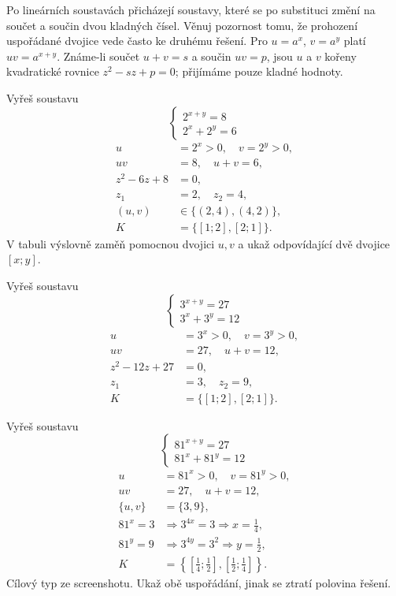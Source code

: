 \documentclass[11pt,a4paper]{article}
\begin{document}
Po lineárních soustavách přicházejí soustavy, které se po substituci změní na součet a součin dvou kladných čísel. Věnuj pozornost tomu, že prohození uspořádané dvojice vede často ke druhému řešení.
Pro $u=a^x$, $v=a^y$ platí $uv=a^{x+y}$. Známe-li součet $u+v=s$ a součin $uv=p$, jsou $u$ a $v$ kořeny kvadratické rovnice $z^2-sz+p=0$; přijímáme pouze kladné hodnoty.
\begin{prikladReseniBox}[title={Příklad 1}]
Vyřeš soustavu \[
\begin{cases}2^{x+y}=8\\2^x+2^y=6\end{cases}
\]
\tcblower
\[
\begin{aligned}u&=2^x>0,\quad v=2^y>0,\\uv&=8,\quad u+v=6,\\z^2-6z+8&=0,\\z_1&=2,\quad z_2=4,\\(u,v)&\in\{(2,4),(4,2)\},\\K&=\{[1;2],[2;1]\}.\end{aligned}
\]
V tabuli výslovně zaměň pomocnou dvojici $u,v$ a ukaž odpovídající dvě dvojice $[x;y]$.
\end{prikladReseniBox}
\begin{prikladReseniBox}[title={Příklad 2}]
Vyřeš soustavu \[
\begin{cases}3^{x+y}=27\\3^x+3^y=12\end{cases}
\]
\tcblower
\[
\begin{aligned}u&=3^x>0,\quad v=3^y>0,\\uv&=27,\quad u+v=12,\\z^2-12z+27&=0,\\z_1&=3,\quad z_2=9,\\K&=\{[1;2],[2;1]\}.\end{aligned}
\]

\end{prikladReseniBox}
\begin{prikladReseniBox}[title={Příklad 3}]
Vyřeš soustavu \[
\begin{cases}81^{x+y}=27\\81^x+81^y=12\end{cases}
\]
\tcblower
\[
\begin{aligned}u&=81^x>0,\quad v=81^y>0,\\uv&=27,\quad u+v=12,\\\{u,v\}&=\{3,9\},\\81^x=3&\Rightarrow 3^{4x}=3\Rightarrow x=\frac{1}{4},\\81^y=9&\Rightarrow 3^{4y}=3^2\Rightarrow y=\frac{1}{2},\\K&=\left\{\left[\frac{1}{4};\frac{1}{2}\right],\left[\frac{1}{2};\frac{1}{4}\right]\right\}.\end{aligned}
\]
Cílový typ ze screenshotu. Ukaž obě uspořádání, jinak se ztratí polovina řešení.
\end{prikladReseniBox}
\end{document}
